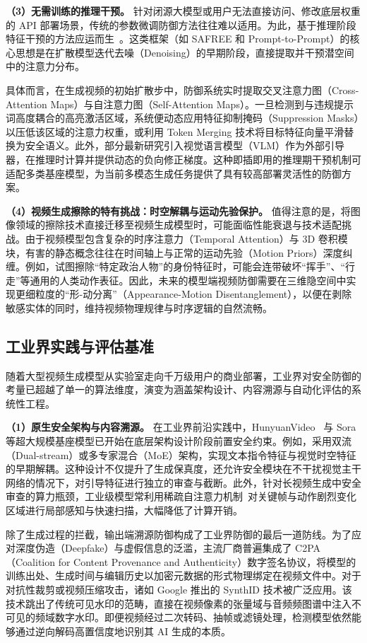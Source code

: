 \textbf{（3）无需训练的推理干预。} 针对闭源大模型或用户无法直接访问、修改底层权重的 API 部署场景，传统的参数微调防御方法往往难以适用。为此，基于推理阶段特征干预的方法应运而生~\cite{yoon2024safree, Hertz2022PrompttoPromptIE, Hu2024TokenMF, Zhuang2024MagnetWN}。这类框架（如 SAFREE 和 Prompt-to-Prompt）的核心思想是在扩散模型迭代去噪（Denoising）的早期阶段，直接提取并干预潜空间中的注意力分布。

具体而言，在生成视频的初始扩散步中，防御系统实时提取交叉注意力图（Cross-Attention Maps）与自注意力图（Self-Attention Maps）。一旦检测到与违规提示词高度耦合的高亮激活区域，系统便动态应用特征抑制掩码（Suppression Masks）以压低该区域的注意力权重，或利用 Token Merging 技术将目标特征向量平滑替换为安全语义。此外，部分最新研究引入视觉语言模型（VLM）作为外部引导器，在推理时计算并提供动态的负向修正梯度。这种即插即用的推理期干预机制可适配多类基座模型，为当前多模态生成任务提供了具有较高部署灵活性的防御方案。

\textbf{（4）视频生成擦除的特有挑战：时空解耦与运动先验保护。} 值得注意的是，将图像领域的擦除技术直接迁移至视频生成模型时，可能面临性能衰退与技术适配挑战。由于视频模型包含复杂的时序注意力（Temporal Attention）与 3D 卷积模块，有害的静态概念往往在时间轴上与正常的运动先验（Motion Priors）深度纠缠。例如，试图擦除“特定政治人物”的身份特征时，可能会连带破坏“挥手”、“行走”等通用的人类动作表征。因此，未来的模型端视频防御需要在三维隐空间中实现更细粒度的“形-动分离”（Appearance-Motion Disentanglement），以便在剥除敏感实体的同时，维持视频物理规律与时序逻辑的自然流畅。

\subsection{工业界实践与评估基准}

随着大型视频生成模型从实验室走向千万级用户的商业部署，工业界对安全防御的考量已超越了单一的算法维度，演变为涵盖架构设计、内容溯源与自动化评估的系统性工程。

\textbf{（1）原生安全架构与内容溯源。}
在工业界前沿实践中，HunyuanVideo~\cite{hunyuan-video} 与 Sora~\cite{sora} 等超大规模基座模型已开始在底层架构设计阶段前置安全约束。例如，采用双流（Dual-stream）或多专家混合（MoE）架构，实现文本指令特征与视觉时空特征的早期解耦。这种设计不仅提升了生成保真度，还允许安全模块在不干扰视觉主干网络的情况下，对引导特征进行独立的审查与截断。此外，针对长视频生成中安全审查的算力瓶颈，工业级模型常利用稀疏自注意力机制~\cite{hunyuanvideo2025}对关键帧与动作剧烈变化区域进行局部感知与快速扫描，大幅降低了计算开销。

除了生成过程的拦截，输出端溯源防御构成了工业界防御的最后一道防线。为了应对深度伪造（Deepfake）与虚假信息的泛滥，主流厂商普遍集成了 C2PA（Coalition for Content Provenance and Authenticity）数字签名协议，将模型的训练出处、生成时间与编辑历史以加密元数据的形式物理绑定在视频文件中。对于对抗性裁剪或视频压缩攻击，诸如 Google 推出的 SynthID 技术被广泛应用。该技术跳出了传统可见水印的范畴，直接在视频像素的张量域与音频频图谱中注入不可见的频域数字水印。即便视频经过二次转码、抽帧或滤镜处理，检测模型依然能够通过逆向解码高置信度地识别其 AI 生成的本质。


